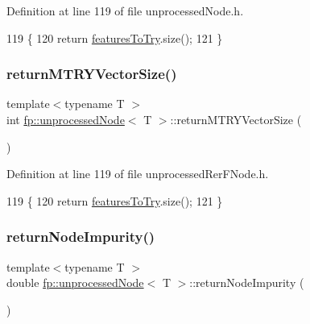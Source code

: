 Definition at line 119 of file unprocessed\+Node.\+h.


\begin{DoxyCode}
119                                                  \{
120                     \textcolor{keywordflow}{return} \hyperlink{classfp_1_1unprocessedNode_ab625569c5339dfbe93b487765f530313}{featuresToTry}.size();
121                 \}
\end{DoxyCode}
\mbox{\label{classfp_1_1unprocessedNode_a208170fb33171f64c83839abbf300705}} 
\subsubsection{\texorpdfstring{return\+M\+T\+R\+Y\+Vector\+Size()}{returnMTRYVectorSize()}\hspace{0.1cm}{\footnotesize\ttfamily [2/2]}}
{\footnotesize\ttfamily template$<$typename T $>$ \\
int \hyperlink{classfp_1_1unprocessedNode}{fp\+::unprocessed\+Node}$<$ T $>$\+::return\+M\+T\+R\+Y\+Vector\+Size (\begin{DoxyParamCaption}{ }\end{DoxyParamCaption})\hspace{0.3cm}{\ttfamily [inline]}}



Definition at line 119 of file unprocessed\+Rer\+F\+Node.\+h.


\begin{DoxyCode}
119                                                  \{
120                     \textcolor{keywordflow}{return} \hyperlink{classfp_1_1unprocessedNode_ab625569c5339dfbe93b487765f530313}{featuresToTry}.size();
121                 \}
\end{DoxyCode}
\mbox{\label{classfp_1_1unprocessedNode_af44e7657d88e4a7bc61b22d97267f940}} 
\subsubsection{\texorpdfstring{return\+Node\+Impurity()}{returnNodeImpurity()}\hspace{0.1cm}{\footnotesize\ttfamily [1/2]}}
{\footnotesize\ttfamily template$<$typename T $>$ \\
double \hyperlink{classfp_1_1unprocessedNode}{fp\+::unprocessed\+Node}$<$ T $>$\+::return\+Node\+Impurity (\begin{DoxyParamCaption}{ }\end{DoxyParamCaption})\hspace{0.3cm}{\ttfamily [inline]}}



